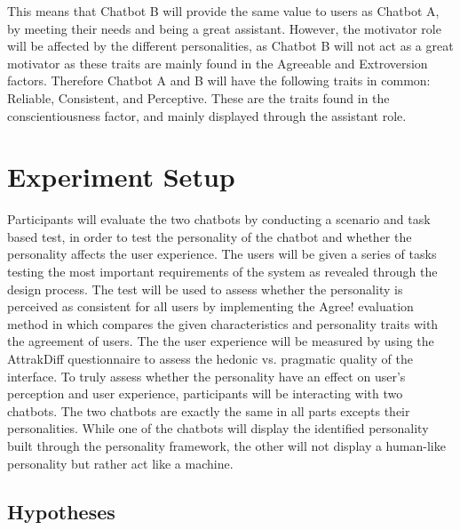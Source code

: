     This means that Chatbot B will provide the same value to users as Chatbot A, by meeting their needs and being a great assistant. However, the motivator role will be affected by the different personalities, as Chatbot B will not act as a great motivator as these traits are mainly found in the Agreeable and Extroversion factors. Therefore Chatbot A and B will have the following traits in common: Reliable, Consistent, and Perceptive. These are the traits found in the conscientiousness factor, and mainly displayed through the assistant role.

\vspace{5mm} %
    
\section{Experiment Setup}
    
Participants will evaluate the two chatbots by conducting a scenario and task based test, in order to test the personality of the chatbot and whether the personality affects the user experience. The users will be given a series of tasks testing the most important requirements of the system as revealed through the design process. The test will be used to assess whether the personality is perceived as consistent for all users by implementing the Agree! evaluation method in which compares the given characteristics and personality traits with the agreement of users. The the user experience will be measured by using the AttrakDiff questionnaire to assess the hedonic vs. pragmatic quality of the interface. To truly assess whether the personality have an effect on user's perception and user experience, participants will be interacting with two chatbots. The two chatbots are exactly the same in all parts excepts their personalities. While one of the chatbots will display the identified personality built through the personality framework, the other will not display a human-like personality but rather act like a machine. %
    
\vspace{5mm} %

    \subsection{Hypotheses}
 
